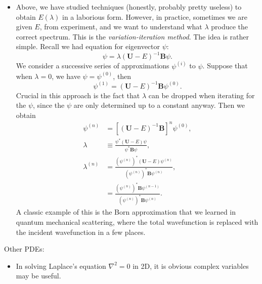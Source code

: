 \documentclass[11pt,
        usenames, %
        dvipsnames %
    ]{report}
\newcommand*{\bm}[1]{\boldsymbol{\mathbf{#1}}}
\newcommand*{\p}[1]{\left(#1\right)}
\newcommand*{\s}[1]{\left[#1\right]}
\begin{document}
\begin{itemize}
    \item Above, we have studied techniques (honestly, probably pretty useless)
        to obtain $E(\lambda)$ in a laborious form. However, in practice,
        sometimes we are given $E$, from experiment, and we want to understand
        what $\lambda$ produce the correct spectrum. This is the
        \emph{variation-iteration method}. The idea is rather simple. Recall we
        had equation for eigenvector $\psi$:
        \begin{equation}
            \psi = \lambda\p{\bm{U} - E}^{-1}\bm{B}\psi.
        \end{equation}
        We consider a successive series of approximations $\psi^{(i)}$ to
        $\psi$. Suppose that when $\lambda = 0$, we have $\psi = \psi^{(0)}$,
        then
        \begin{equation}
            \psi^{(1)} = \p{\bm{U} - E}^{-1}\bm{B}\psi^{(0)}.
        \end{equation}
        Crucial in this approach is the fact that $\lambda$ can be dropped when
        iterating for the $\psi$, since the $\psi$ are only determined up to a
        constant anyway. Then we obtain
        \begin{align}
            \psi^{(n)} &= \s{\p{\bm{U} - E}^{-1} \bm{B}}^n \psi^{(0)},\\
            \lambda &\equiv \frac{\psi^*\p{\bm{U} - E}\psi}{\psi^* \bm{B}\psi}
                    ,\\
            \lambda^{(n)} &= \frac{\p{\psi^{(n)}}^* \p{\bm{U} - E}
                    \psi^{(n)}}{\p{\psi^{(n)}}^* \bm{B}\psi^{(n)}},\\
                &= \frac{\p{\psi^{(n)}}^*\bm{B}
                    \psi^{(n - 1)}}{\p{\psi^{(n)}}^* \bm{B}\psi^{(n)}}.
        \end{align}
        A classic example of this is the Born approximation that we learned in
        quantum mechanical scattering, where the total wavefunction is replaced
        with the incident wavefunction in a few places.
\end{itemize}

Other PDEs:
\begin{itemize}
    \item In solving Laplace's equation $\nabla^2 = 0$ in 2D, it is obvious
        complex variables may be useful.
\end{itemize}
\end{document}
